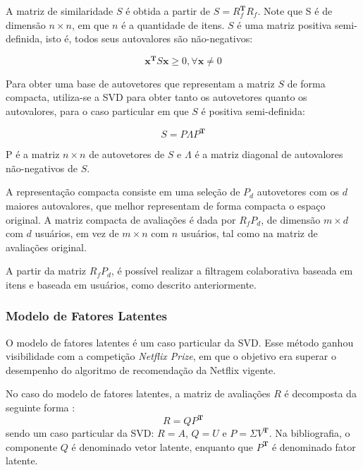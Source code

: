 A matriz de similaridade $S$ é obtida a partir de $S = R_f^{\mathbf{T} }R_f$.
Note que S é de dimensão $n \times n$, em que $n$ é a quantidade de itens. $S$ é
uma matriz positiva semi-definida, isto é, todos seus autovalores são
não-negativos:

\begin{equation}
    \mathbf{x}^{\mathbf{T}} S \mathbf{x} \geq 0, \forall \mathbf{x} \neq 0
\end{equation}

 Para obter uma base de autovetores que representam a matriz $S$ de forma
 compacta, utiliza-se a SVD para obter tanto os autovetores quanto os autovalores,
 para o caso particular em que $S$ é positiva semi-definida:

\begin{equation}
    S = P \Lambda P^{\mathbf{T}}
\end{equation}

P é a matriz $n \times n$ de autovetores de $S$ e $\Lambda$ é a matriz diagonal
de autovalores não-negativos de $S$.

A representação compacta consiste em uma seleção de $P_d$ autovetores com os $d$
maiores autovalores, que melhor representam de forma compacta o espaço original.
A matriz compacta de avaliações é dada por $R_{f}P_{d}$, de dimensão $m \times
d$ com $d$ usuários, em vez de $m \times n$ com $n$ usuários, tal como na matriz
de avaliações original.

A partir da matriz $R_{f}P_{d}$, é possível realizar a filtragem colaborativa
baseada em itens e baseada em usuários, como descrito anteriormente.

\subsubsection{Modelo de Fatores Latentes}
O modelo de fatores latentes é um caso particular da SVD. Esse método ganhou 
visibilidade com a competição \textit{Netflix Prize}, em que o objetivo era
superar o desempenho do algoritmo de recomendação da Netflix vigente.

No caso do modelo de fatores latentes, a matriz de avaliações $R$ é decomposta
da seguinte forma \cite{aggarwal2016recommender}:
\begin{equation}
    R = QP^{\mathbf{T}}
\end{equation}
sendo um caso particular da SVD: $R = A$, $Q = U$ e $P = \Sigma V^{\mathbf{T}}$.
Na bibliografia, o componente $Q$ é denominado vetor latente, enquanto que
$P^{\mathbf{T}}$ é denominado fator latente.

